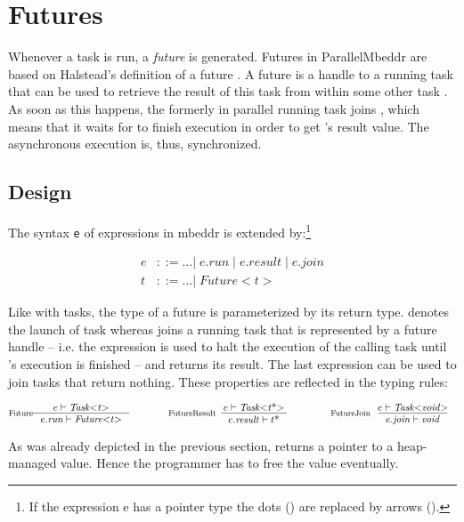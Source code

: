 \section{Futures}
Whenever a task  is run, a \textit{future} is generated. Futures in ParallelMbeddr are based on Halstead's definition of a future \cite{Halstead_Multilisp}. A future is a handle to a running task that can be used to retrieve the result of this task from within some other task . As soon as this happens, the formerly in parallel running task  joins , which means that it waits for  to finish execution in order to get 's result value. The asynchronous execution is, thus, synchronized.

\subsection{Design}
The syntax \texttt{e} of expressions in mbeddr is extended by:\footnote{If the expression e has a pointer type the dots () are replaced by arrows (\CODE{->}).}

\begin{equation}
\begin{split}
e & ::= ...|\;e.\mathit{run}\;|\;e.\mathit{result}\;|\;e.\mathit{join}\\
t & ::= ...|\;\mathit{Future{<}t{>}}
\end{split}
\end{equation}

Like with tasks, the type of a future is parameterized by its return type.  denotes the launch of task  whereas  joins a running task that is represented by a future handle  -- i.e. the expression is used to halt the execution of the calling task until 's execution is finished -- and returns its result. The last expression  can be used to join tasks that return nothing. These properties are reflected in the typing rules:

\begin{equation}
\inference*[Future]{e |- \mathit{Task{<}t{>}}}{e.\mathit{run} |- \mathit{Future{<}t{>}}}
\qquad\qquad
\inference*[FutureResult]{e |- \mathit{Task{<}t\text{*}{>}}}{e.\mathit{result} |- t\text{*}}
\qquad\qquad
\inference*[FutureJoin]{e |- \mathit{Task{<}void{>}}}{e.\mathit{join} |- \mathit{void}}
\end{equation}

As was already depicted in the previous section,  
 returns a pointer to a heap-managed value. Hence the programmer has to free the value eventually.

